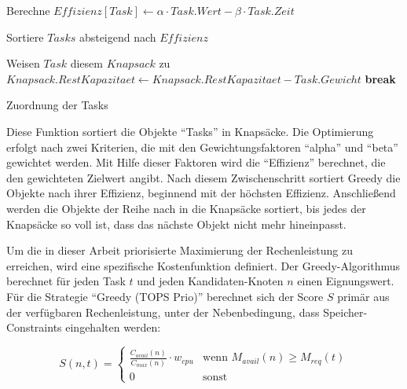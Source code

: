 \begin{algorithmic}
    
        \State Berechne $Effizienz[Task] \leftarrow \alpha \cdot Task.Wert - \beta \cdot Task.Zeit$
    \EndFor
    
    \State Sortiere $Tasks$ absteigend nach $Effizienz$
    
                \State Weisen $Task$ diesem $Knapsack$ zu
                \State $Knapsack.RestKapazitaet \leftarrow Knapsack.RestKapazitaet - Task.Gewicht$
                \State \textbf{break}
            \EndIf
        \EndFor
    \EndFor

    \State \Return Zuordnung der Tasks
    \EndFunction
\end{algorithmic}

Diese Funktion sortiert die Objekte \enquote{Tasks} in Knapsäcke. Die Optimierung erfolgt nach zwei Kriterien, die mit den Gewichtungsfaktoren \enquote{alpha} und \enquote{beta} gewichtet werden. Mit Hilfe dieser Faktoren wird die \enquote{Effizienz} berechnet, die den gewichteten Zielwert angibt. Nach diesem Zwischenschritt sortiert Greedy die Objekte nach ihrer Effizienz, beginnend mit der höchsten Effizienz. Anschließend werden die Objekte der Reihe nach in die Knapsäcke sortiert, bis jedes der Knapsäcke so voll ist, dass das nächste Objekt nicht mehr hineinpasst. 

Um die in dieser Arbeit priorisierte Maximierung der Rechenleistung zu erreichen, wird eine spezifische Kostenfunktion definiert. Der Greedy-Algorithmus berechnet für jeden Task $t$ und jeden Kandidaten-Knoten $n$ einen Eignungswert. Für die Strategie \enquote{Greedy (TOPS Prio)} berechnet sich der Score $S$ primär aus der verfügbaren Rechenleistung, unter der Nebenbedingung, dass Speicher-Constraints eingehalten werden:

\begin{equation}
    S(n, t) = 
    \begin{cases} 
      \frac{C_{avail}(n)}{C_{max}(n)} \cdot w_{cpu} & \text{wenn } M_{avail}(n) \ge M_{req}(t) \\
      0 & \text{sonst}
   \end{cases}
   \label{eq:scoring_function}
\end{equation}

